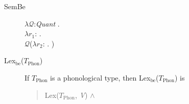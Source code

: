 \begin{description}
        
      \item[\textnormal{SemBe}] \mbox{}

        $\lambda\mathcal{Q}$:\textit{Quant} . \\
\hspace*{1em} $\lambda r_1$:
. \\
\hspace*{2em} $\mathcal{Q}$($\lambda
r_2$:
. )

\item[\textnormal{Lex$_{\mathrm{be}}$($T_{\mathrm{Phon}}$)}] \mbox{}

  If $T_{\mathrm{Phon}}$ is a phonological type, then
  Lex$_{\mathrm{be}}$($T_{\mathrm{Phon}}$) is
\begin{quote}
  Lex($T_{\mathrm{Phon}}$,
\textit{V}) \d{$\wedge$}
\end{quote}
  
        

  
  
\end{description}


